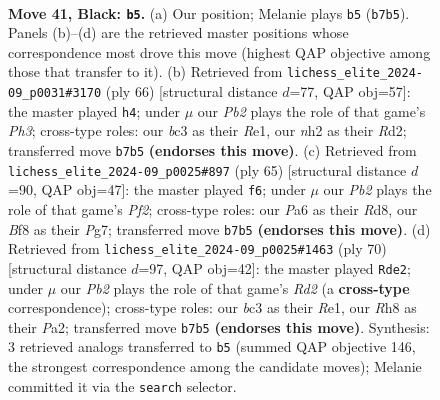 \documentclass[11pt]{article}
\begin{document}
\clearpage

\begin{figure}[p]\centering
\begin{subfigure}{0.46\textwidth}\centering
\resizebox{\linewidth}{!}{%
\newchessgame
\chessboard[
  setfen={5b1r/rpk3p1/p1p4p/P2b1p2/R1p4P/2B1P1P1/1P3P1N/3K2R1 b - - 5 41},
  showmover=false,
  pgfstyle=straightmove, color=movearrow, markmove={b7-b5}
]}
\caption{}
\end{subfigure}\hfill
\begin{subfigure}{0.46\textwidth}\centering
\resizebox{\linewidth}{!}{%
\newchessgame
\chessboard[
  setfen={3r4/1b2r1k1/p5p1/P3pp1p/2Bp4/3P1P1P/1PPR2P1/4R1K1 w - - 2 34},
  showmover=false,
  pgfstyle=straightmove, color=movearrow, markmove={h3-h4}
]}
\caption{}
\end{subfigure}
\\[4pt]
\begin{subfigure}{0.46\textwidth}\centering
\resizebox{\linewidth}{!}{%
\newchessgame
\chessboard[
  setfen={3r2k1/5pp1/p2r3p/P2pp3/1Np3P1/1bP1PP1P/1P1R1K2/R7 b - - 0 33},
  showmover=false,
  pgfstyle=straightmove, color=movearrow, markmove={f7-f6}
]}
\caption{}
\end{subfigure}\hfill
\begin{subfigure}{0.46\textwidth}\centering
\resizebox{\linewidth}{!}{%
\newchessgame
\chessboard[
  setfen={4r3/2rbppk1/p2n3p/2pP2p1/2P3P1/1PN4P/P1BR1P2/4R1K1 w - - 4 36},
  showmover=false,
  pgfstyle=straightmove, color=movearrow, markmove={d2-e2}
]}
\caption{}
\end{subfigure}
\caption{\textbf{Move 41, Black: \texttt{b5}.} (a) Our position; Melanie plays \texttt{b5} (\texttt{b7b5}). Panels (b)--(d) are the retrieved master positions whose correspondence most drove this move (highest QAP objective among those that transfer to it). (b) Retrieved from \texttt{lichess\_elite\_2024-09\_p0031\#3170} (ply 66) [structural distance $d$=77, QAP obj=57]: the master played \texttt{h4}; under $\mu$ our \emph{Pb2} plays the role of that game's \emph{Ph3}; cross-type roles: our \emph{b}c3 as their \emph{R}e1, our \emph{n}h2 as their \emph{R}d2; transferred move \texttt{b7b5} \textbf{(endorses this move)}. (c) Retrieved from \texttt{lichess\_elite\_2024-09\_p0025\#897} (ply 65) [structural distance $d$=90, QAP obj=47]: the master played \texttt{f6}; under $\mu$ our \emph{Pb2} plays the role of that game's \emph{Pf2}; cross-type roles: our \emph{P}a6 as their \emph{R}d8, our \emph{B}f8 as their \emph{P}g7; transferred move \texttt{b7b5} \textbf{(endorses this move)}. (d) Retrieved from \texttt{lichess\_elite\_2024-09\_p0025\#1463} (ply 70) [structural distance $d$=97, QAP obj=42]: the master played \texttt{Rde2}; under $\mu$ our \emph{Pb2} plays the role of that game's \emph{Rd2} (a \textbf{cross-type} correspondence); cross-type roles: our \emph{b}c3 as their \emph{R}e1, our \emph{R}h8 as their \emph{P}a2; transferred move \texttt{b7b5} \textbf{(endorses this move)}. Synthesis: 3 retrieved analogs transferred to \texttt{b5} (summed QAP objective 146, the strongest correspondence among the candidate moves); Melanie committed it via the \texttt{search} selector.}
\label{fig:thought-m81}
\end{figure}
\end{document}

